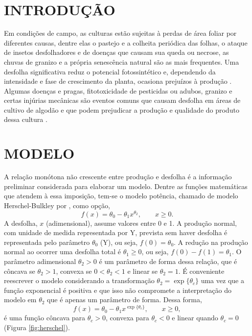 \section{INTRODUÇÃO}

Em condições de campo, as culturas estão sujeitas à perdas de área
foliar por diferentes causas, dentre elas o pastejo e a colheita
periódica das folhas, o ataque de insetos desfolhadores e de doenças
que causam sua queda ou necrose, as chuvas de granizo e a própria
senescência natural são as mais frequentes.  Uma desfolha
significativa reduz o potencial fotossintético e, dependendo da
intensidade e fase de crescimento da planta, ocasiona prejuízos à
produção \cite{Painter1981,Klubertanz1996}.  Algumas doenças e pragas,
fitotoxicidade de pesticidas ou adubos, granizo e certas injúrias
mecânicas são eventos comuns que causam desfolha em áreas de cultivo
de algodão e que podem prejudicar a produção e qualidade do produto
dessa cultura \cite{Silva2012a}.

\newpage
\section{MODELO}

A relação monótona não crescente entre produção e desfolha é a
informação preliminar considerada para elaborar um modelo. Dentre as
funções matemáticas que atendem à essa imposição, tem-se o modelo
potência, chamado de modelo Herschel-Bulkley por
, como opção,
\begin{equation}
 f(x) = \theta_0-\theta_1 x^{\theta_2}, \qquad x\geq 0.
\end{equation}
A desfolha, $x$ (adimensional), assume valores entre 0 e 1.  A
produção normal, com unidade de medida representada por Y, prevista
sem haver desfolha é representada pelo parâmetro $\theta_0$ (Y), ou
seja, $f(0) = \theta_0$.  A redução na produção normal ao ocorrer uma
desfolha total é $\theta_1\geq 0$, ou seja, $f(0)-f(1) = \theta_1$.  O
parâmetro adimensional $\theta_2>0$ é um parâmetro de forma dessa
relação, que é côncava se $\theta_2>1$, convexa se $0<\theta_2<1$ e
linear se $\theta_2=1$. É conveniente reescrever o modelo considerando
a transformação $\theta_2 = \exp\{\theta_c\}$ uma vez que a função
exponencial é positiva e que isso não compromete a interpretação do
modelo em $\theta_2$ que é apenas um parâmetro de forma.  Dessa forma,
\begin{equation}\label{eq-modelo}
 f(x) = \theta_0-\theta_1 x^{\exp\{\theta_c\}}, \qquad x\geq 0,
\end{equation}
é uma função côncava para $\theta_c>0$, convexa para $\theta_c<0$ e
linear quando $\theta_c=0$ (Figura \ref{fig:herschel}).

